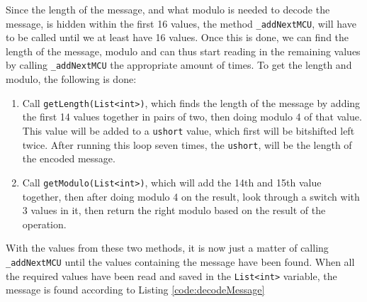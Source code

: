 Since the length of the message, and what modulo is needed to decode the message, is hidden within the first 16 values, the method \lstinline|_addNextMCU|, will have to be called until we at least have 16 values.
Once this is done, we can find the length of the message, modulo and can thus start reading in the remaining values by calling \lstinline|_addNextMCU| the appropriate amount of times.
To get the length and modulo, the following is done:
\begin{enumerate}
	\item Call \lstinline|getLength(List<int>)|, which finds the length of the message by adding the first 14 values together in pairs of two, then doing modulo 4 of that value. 
	This value will be added to a \lstinline|ushort| value, which first will be bitshifted left twice. 
	After running this loop seven times, the \lstinline|ushort|, will be the length of the encoded message.
	\item Call \lstinline|getModulo(List<int>)|, which will add the 14th and 15th value together, then after doing modulo 4 on the result, look through a switch with 3 values in it, then return the right modulo based on the result of the operation.
\end{enumerate}
With the values from these two methods, it is now just a matter of calling \lstinline|_addNextMCU| until the values containing the message have been found.
When all the required values have been read and saved in the \lstinline|List<int>| variable, the message is found according to Listing \ref{code:decodeMessage}

